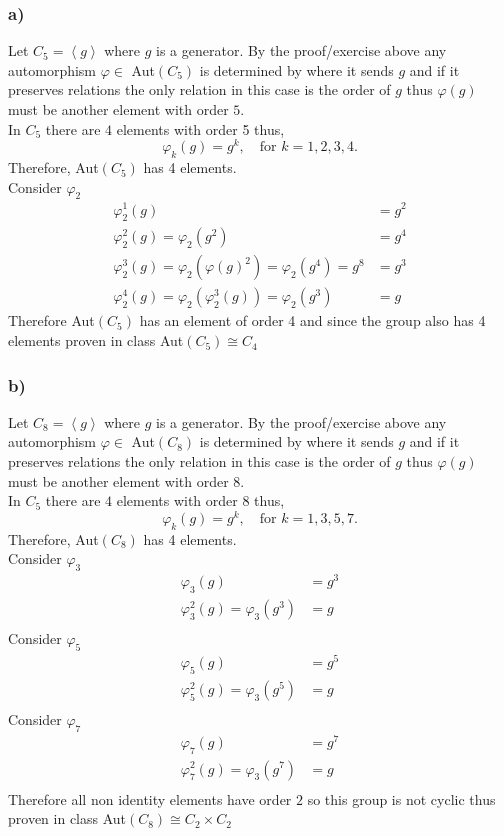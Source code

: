 \documentclass[12pt, letterpaper]{article}
\theoremstyle{definition}
\newcommand{\ang}[1]{\left\langle #1 \right\rangle}
\begin{document}
\subsubsection*{a)}
Let $C_5=\ang{g}$ where $g$ is a generator. By the proof/exercise above any automorphism $\varphi \in $ Aut$(C_5)$ is determined by where it sends $g$ and if it preserves relations the only relation in this case is the order of $g$ thus $\varphi(g)$ must be another element with order $5$.\\
In $C_5$ there are $4$ elements with order 5 thus,\\
\[
\varphi_k(g)=g^k, \quad \text{for $k = 1,2,3,4$.}
\]
Therefore, Aut$(C_5)$ has 4 elements.\\
Consider $\varphi_2$
\begin{align*}
    \varphi_2^1(g)&=g^2\\
    \varphi_2^2(g)=\varphi_2(g^2)&=g^4\\
    \varphi_2^3(g)=\varphi_2(\varphi(g)^2)=\varphi_2(g^4)=g^8&=g^3\\
    \varphi_2^4(g)=\varphi_2(\varphi_2^3(g))=\varphi_2(g^3)&=g
\end{align*}
Therefore Aut$(C_5)$ has an element of order 4 and since the group also has 4 elements proven in class Aut$(C_5) \cong C_4$
\subsubsection*{b)}
Let $C_8=\ang{g}$ where $g$ is a generator. By the proof/exercise above any automorphism $\varphi \in $ Aut$(C_8)$ is determined by where it sends $g$ and if it preserves relations the only relation in this case is the order of $g$ thus $\varphi(g)$ must be another element with order $8$.\\
In $C_5$ there are $4$ elements with order 8 thus,\\
\[
\varphi_k(g)=g^k, \quad \text{for $k = 1,3,5,7$.}
\]
Therefore, Aut$(C_8)$ has 4 elements.\\
Consider $\varphi_3$
\begin{align*}
    \varphi_3(g)&=g^3\\
    \varphi_3^2(g)=\varphi_3(g^3)&=g\\
\end{align*}
Consider $\varphi_5$
\begin{align*}
    \varphi_5(g)&=g^5\\
    \varphi_5^2(g)=\varphi_3(g^5)&=g\\
\end{align*}
Consider $\varphi_7$
\begin{align*}
    \varphi_7(g)&=g^7\\
    \varphi_7^2(g)=\varphi_3(g^7)&=g\\
\end{align*}
Therefore all non identity elements have order $2$ so this group is not cyclic thus proven in class Aut$(C_8) \cong C_2 \times C_2$
\end{document}

